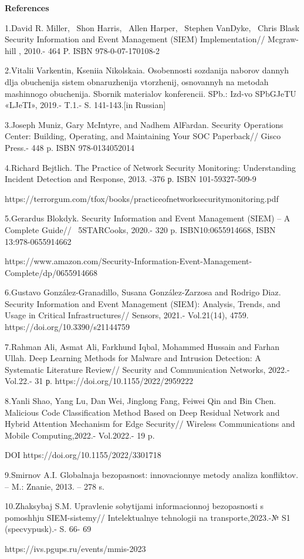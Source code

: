 \begin{center}
{\bfseries References}
\end{center}

\begin{noparindent}
1.David R. Miller,~ Shon Harris,~ Allen Harper,~ Stephen VanDyke,~ Chris
Blask Security Information and Event Management (SIEM) Implementation//
Mcgraw-hill , 2010.- 464 P. ISBN 978-0-07-170108-2

2.Vitalii Varkentin, Kseniia Nikolskaia. Osobennosti sozdanija naborov
dannyh dlja obuchenija sistem obnaruzhenija vtorzhenij, osnovannyh na
metodah mashinnogo obuchenija. Sbornik materialov konferencii. SPb.:
Izd-vo SPbGJeTU «LJeTI», 2019.- T.1.- S. 141-143.{[}in Russian{]}

3.Joseph Muniz, Gary McIntyre, and Nadhem AlFardan. Security Operations
Center: Building, Operating, and Maintaining Your SOC Paperback// Gisco
Press.- 448 p. ISBN 978-0134052014

4.Richard Bejtlich. The Practice of Network Security Monitoring:
Understanding Incident Detection and Response, 2013. -376 р. ISBN
101-59327-509-9

https://terrorgum.com/tfox/books/practiceofnetworksecuritymonitoring.pdf

5.Gerardus Blokdyk. Security Information and Event Management (SIEM) --
A Complete Guide// ~5STARCooks, 2020.- 320 p. ISBN10:0655914668, ISBN
13:978-0655914662

https://www.amazon.com/Security-Information-Event-Management-Complete/dp/0655914668

6.Gustavo González-Granadillo, Susana González-Zarzosa and Rodrigo Diaz.
Security Information and Event Management (SIEM): Analysis, Trends, and
Usage in Critical Infrastructures// Sensors, 2021.- Vol.21(14), 4759.
https://doi.org/10.3390/s21144759

7.Rahman Ali, Asmat Ali, Farkhund Iqbal, Mohammed Hussain and Farhan
Ullah. Deep Learning Methods for Malware and Intrusion Detection: A
Systematic Literature Review// Security and Communication Networks,
2022.- Vol.22.- 31 р. https://doi.org/10.1155/2022/2959222

8.Yanli Shao, Yang Lu, Dan Wei, Jinglong Fang, Feiwei Qin and Bin Chen.
Malicious Code Classification Method Based on Deep Residual Network and
Hybrid Attention Mechanism for Edge Security// Wireless Communications
and Mobile Computing,2022.- Vol.2022.- 19 p.

DOI https://doi.org/10.1155/2022/3301718

9.Smirnov A.I. Global\textquotesingle naja bezopasnost\textquotesingle:
innovacionnye metody analiza konfliktov. -- M.: Znanie, 2013. -- 278 s.

10.Zhaksybaj S.M. Upravlenie sobytijami informacionnoj bezopasnosti s
pomoshh\textquotesingle ju SIEM-sistemy//
Intelektual\textquotesingle nye tehnologii na transporte,2023.-№ S1
(specvypusk).- S. 66- 69

https://ivs.pgups.ru/events/mmis-2023
\end{noparindent}

